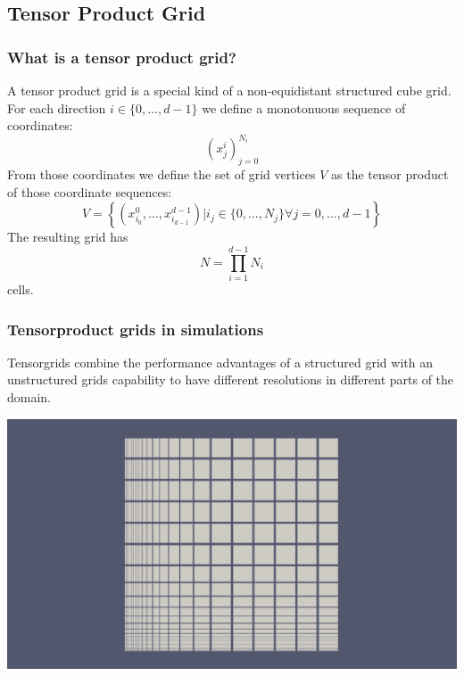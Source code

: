 \documentclass[ignorenonframetext,11pt]{beamer}
\theoremstyle{definition}
\begin{document}
\subsection{Tensor Product Grid}

\begin{frame}[fragile]
 \frametitle{What is a tensor product grid?}
 A tensor product grid is a special kind of a non-equidistant structured cube grid.
 For each direction $i\in\{ 0,\dots ,d-1\}$ we define a monotonuous sequence of
 coordinates:
 \begin{displaymath}
  \left(x^i_j\right)_{j=0}^{N_i}
 \end{displaymath}
 From those coordinates we define the set of grid vertices $V$ as the tensor product
 of those coordinate sequences:
 \begin{displaymath}
   V = \left\{(x^0_{i_0},\dots ,x^{d-1}_{i_{d-1}}) \big| i_j\in \{0,\dots ,N_j\} \forall j=0,\dots ,d-1\right\}
 \end{displaymath}
 The resulting grid has
 \begin{displaymath}
  N = \prod_{i=1}^{d-1}N_i
 \end{displaymath}
 cells.
\end{frame}


\begin{frame}
 \frametitle{Tensorproduct grids in simulations}

 Tensorgrids combine the performance advantages of a structured grid with
 an unstructured grids capability to have different resolutions in different
 parts of the domain.
 \begin{center}
  \includegraphics[width=.6\textwidth]{figures/io/tensorprod.png}
 \end{center}
\end{frame}
\end{document}
